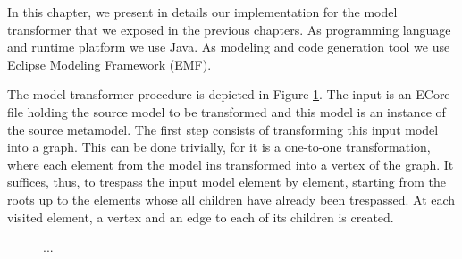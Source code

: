 In this chapter, we present in details our implementation for the model transformer that we exposed in the previous chapters. As programming language and runtime platform we use Java. As modeling and code generation tool we use Eclipse Modeling Framework (EMF).

The model transformer procedure is depicted in Figure \ref{fig:implementation-scheme}. The input is an ECore file holding the source model to be transformed and this model is an instance of the source metamodel. The first step consists of transforming this input model into a graph. This can be done trivially, for it is a one-to-one transformation, where each element from the model ins transformed into a vertex of the graph. It suffices, thus, to trespass the input model element by element, starting from the roots up to the elements whose all children have already been trespassed. At each visited element, a vertex and an edge to each of its children is created.

\begin{figure}[h]
	
	\caption{...}
	\label{fig:implementation-scheme}
\end{figure}